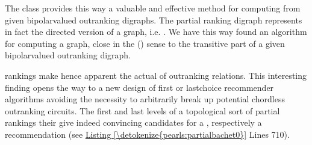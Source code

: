 \documentclass[a4paper,12pt,english]{sphinxhowto}
\begin{document}
\sphinxAtStartPar
The  class provides this way a valuable and effective method for computing  from given bipolar\sphinxhyphen{}valued outranking digraphs. The partial  ranking digraph represents in fact the directed version of a  graph, i.e.  . We have this way found an algorithm for computing a  graph, close in the {\hyperref[\detokenize{pearls:ordinalcorrelation-tutorial-label}]{}} () sense to the transitive part of a given bipolar\sphinxhyphen{}valued outranking digraph.

\begin{sphinxVerbatim}[commandchars=\\\{\},numbers=left,firstnumber=1,stepnumber=1]
  
\end{sphinxVerbatim}

\sphinxAtStartPar
{} rankings make hence apparent the actual  of outranking relations. This interesting finding opens the way to a new design of first\sphinxhyphen{} or last\sphinxhyphen{}choice recommender algorithms avoiding the necessity to arbitrarily break up potential chordless outranking circuits. The first and last levels of a topological sort of partial rankings \textendash{}their \textendash{} give indeed convincing candidates for a , respectively a  recommendation (see \hyperref[\detokenize{pearls:partialbachet0}]{Listing \ref{\detokenize{pearls:partialbachet0}}} Lines 7\sphinxhyphen{}10).
\end{document}

